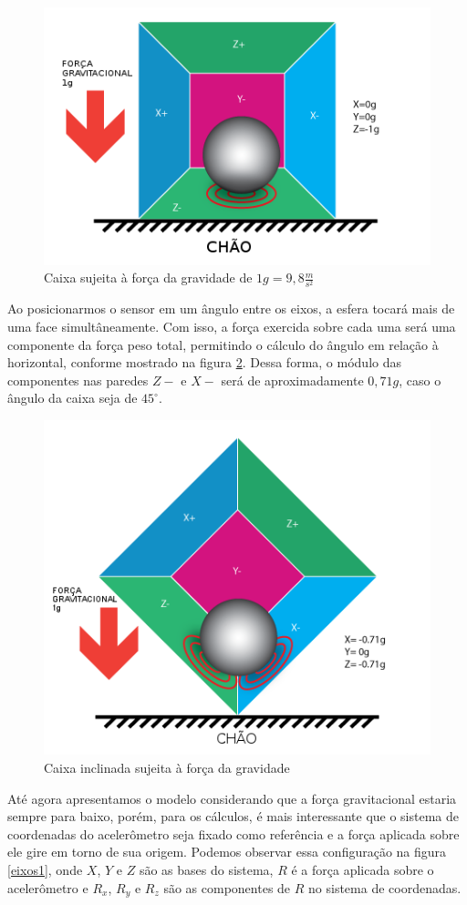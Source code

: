 \documentclass[a4paper,12pt]{article}
\begin{document}
\begin{figure}[H]
\centering
\includegraphics[width=.6\textwidth]{img/acel3.png}
\caption{Caixa sujeita à força da gravidade de $1g=9,8 \frac{m}{s^2}$}
\label{acel3}
\end{figure}

Ao posicionarmos o sensor em um ângulo entre os eixos, a esfera tocará mais de uma face simultâneamente. Com isso, a força exercida sobre cada uma será uma componente da força peso total, permitindo o cálculo do ângulo em relação à horizontal, conforme mostrado na figura \ref{acel4}. Dessa forma, o módulo das componentes nas paredes $Z-$ e $X-$ será de aproximadamente $0,71g$, caso o ângulo da caixa seja de $45^\circ$.

\begin{figure}[H]
\centering
\includegraphics[width=.6\textwidth]{img/acel4.png}
\caption{Caixa inclinada sujeita à força da gravidade}
\label{acel4}
\end{figure}

Até agora apresentamos o modelo considerando que a força gravitacional estaria sempre para baixo, porém, para os cálculos, é mais interessante que o sistema de coordenadas do acelerômetro seja fixado como referência e a força aplicada sobre ele gire em torno de sua origem. Podemos observar essa configuração na figura \ref{eixos1}, onde $X$, $Y$ e $Z$ são as bases do sistema, $R$ é a força aplicada sobre o acelerômetro e $R_x$, $R_y$ e $R_z$ são as componentes de $R$ no sistema de coordenadas.
\end{document}
